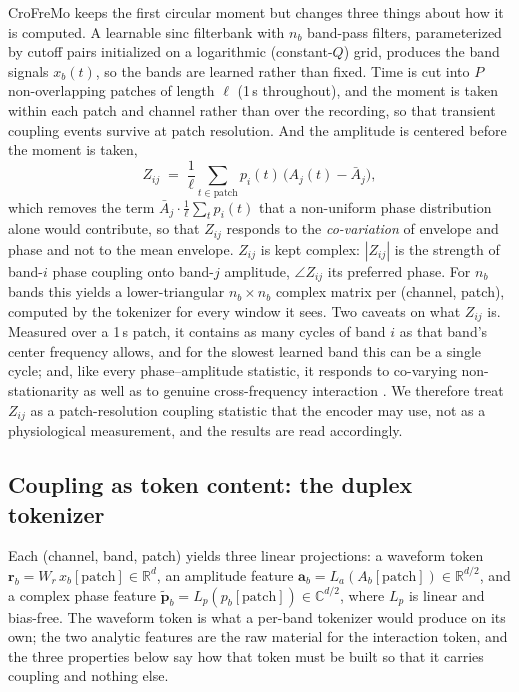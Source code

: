 CroFreMo keeps the first circular moment but changes three things about how
it is computed. A learnable sinc filterbank \citep{ravanelli2018sincnet}
with $n_b$ band-pass filters, parameterized by cutoff pairs initialized on
a logarithmic (constant-$Q$) grid, produces the band signals $x_b(t)$, so
the bands are learned rather than fixed. Time is cut into $P$
non-overlapping patches of length $\ell$ (1\,s throughout), and the moment is
taken within each patch and channel rather than over the recording, so
that transient coupling events survive at patch resolution. And the
amplitude is centered before the moment is taken,
\begin{equation}
Z_{ij} \;=\; \frac{1}{\ell}\sum_{t \in \text{patch}}
p_i(t)\,\bigl(A_j(t) - \bar A_j\bigr),
\label{eq:mvl}
\end{equation}
which removes the term $\bar A_j \cdot \frac{1}{\ell}\sum_t p_i(t)$ that a
non-uniform phase distribution alone would contribute, so that $Z_{ij}$
responds to the \emph{co-variation} of envelope and phase and not to
the mean envelope. $Z_{ij}$ is kept complex: $|Z_{ij}|$ is the strength of
band-$i$ phase coupling onto band-$j$ amplitude, $\angle Z_{ij}$ its
preferred phase. For $n_b$ bands this yields a lower-triangular
$n_b \times n_b$ complex matrix per (channel, patch), computed by the
tokenizer for every window it sees. Two caveats on what $Z_{ij}$ is.
Measured over a 1\,s patch, it contains as many cycles of band $i$ as
that band's center frequency allows, and for the slowest learned band
this can be a single cycle; and, like every phase--amplitude statistic,
it responds to co-varying non-stationarity as well as to genuine
cross-frequency interaction \citep{aru2015untangling}. We therefore treat
$Z_{ij}$ as a patch-resolution coupling statistic that the encoder may
use, not as a physiological measurement, and the results are read
accordingly.

\subsection{Coupling as token content: the duplex tokenizer}
\label{sec:tokenizer}

Each (channel, band, patch) yields three linear projections: a waveform
token $\mathbf{r}_b = W_r\,x_b[\text{patch}] \in \mathbb{R}^d$, an
amplitude feature
$\mathbf{a}_b = L_a(A_b[\text{patch}]) \in \mathbb{R}^{d/2}$, and a complex
phase feature
$\tilde{\mathbf{p}}_b = L_p(p_b[\text{patch}]) \in \mathbb{C}^{d/2}$, where
$L_p$ is linear and bias-free. The waveform token is what a per-band
tokenizer would produce on its own; the two analytic features are the raw
material for the interaction token, and the three properties below say how
that token must be built so that it carries coupling and nothing else.

